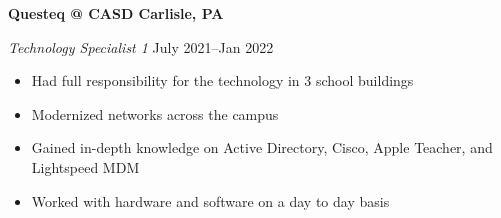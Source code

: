 \textbf{Questeq @ CASD \hfill  Carlisle, PA} \par
\textit{Technology Specialist 1} \hfill July 2021--Jan 2022 \par
\begin{itemize}
	\item Had full responsibility for the technology in 3 school buildings
	\item Modernized networks across the campus
	\item Gained in-depth knowledge on Active Directory, Cisco, Apple Teacher, and Lightspeed MDM
	\item Worked with hardware and software on a day to day basis
\end{itemize} \par